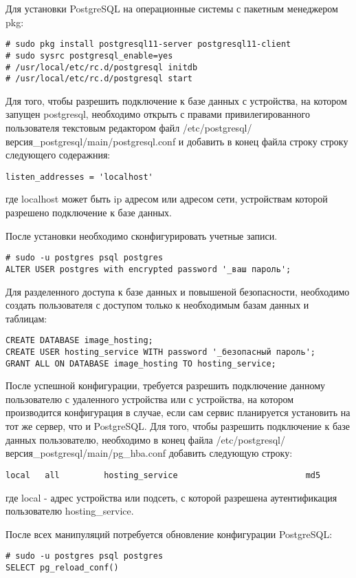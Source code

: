 Для установки PostgreSQL на операционные системы с пакетным менеджером pkg:
\begin{lstlisting}
# sudo pkg install postgresql11-server postgresql11-client
# sudo sysrc postgresql_enable=yes
# /usr/local/etc/rc.d/postgresql initdb
# /usr/local/etc/rc.d/postgresql start
\end{lstlisting}

Для того, чтобы разрешить подключение к базе данных с устройства, на котором запущен postgresql, необходимо открыть с правами привилегированного пользователя текстовым редактором файл /etc/postgresql/версия_postgresql/main/postgresql.conf и добавить в конец файла строку строку следующего содеражния:
\begin{lstlisting}
listen_addresses = 'localhost'
\end{lstlisting}
где localhost может быть ip адресом или адресом сети, устройствам которой разрешено подключение к базе данных.

После установки необходимо сконфигурировать учетные записи.
\begin{lstlisting}
# sudo -u postgres psql postgres
ALTER USER postgres with encrypted password '_ваш пароль';
\end{lstlisting}
Для разделенного доступа к базе данных и повышеной безопасности, необходимо создать пользователя с доступом только к необходимым базам данных и таблицам:
\begin{lstlisting}
CREATE DATABASE image_hosting;
CREATE USER hosting_service WITH password '_безопасный пароль';
GRANT ALL ON DATABASE image_hosting TO hosting_service;
\end{lstlisting}

После успешной конфигурации, требуется разрешить подключение данному пользователю с удаленного устройства или с устройства, на котором производится конфигурация в случае, если сам сервис планируется установить на тот же сервер, что и PostgreSQL. Для того, чтобы разрешить подключение к базе данных пользователю, необходимо в конец файла /etc/postgresql/версия_postgresql/main/pg_hba.conf добавить следующую строку:
\begin{lstlisting}
local   all         hosting_service                          md5
\end{lstlisting}
где local - адрес устройства или подсеть, с которой разрешена аутентификация пользователю hosting_service.

После всех манипуляций потребуется обновление конфигурации PostgreSQL:
\begin{lstlisting}
# sudo -u postgres psql postgres
SELECT pg_reload_conf()
\end{lstlisting}


